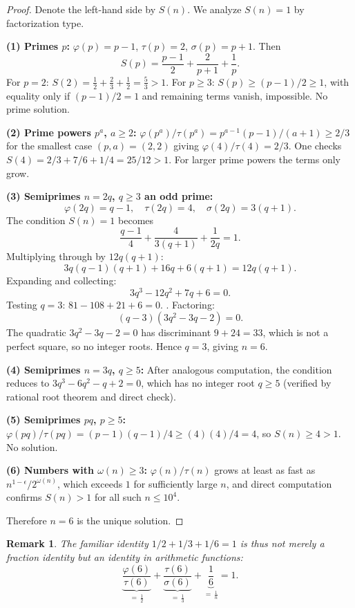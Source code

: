 \documentclass[12pt]{article}
\newtheorem{remark}[theorem]{Remark}
\begin{document}
\begin{proof}
Denote the left-hand side by $S(n)$.  We analyze $S(n)=1$ by factorization type.

\medskip\noindent\textbf{(1) Primes $p$:}
$\varphi(p)=p-1$, $\tau(p)=2$, $\sigma(p)=p+1$.  Then
\[
  S(p) = \frac{p-1}{2} + \frac{2}{p+1} + \frac{1}{p}.
\]
For $p=2$: $S(2)=\tfrac{1}{2}+\tfrac{2}{3}+\tfrac{1}{2}=\tfrac{5}{3}>1$.
For $p\ge3$: $S(p)\ge(p-1)/2\ge1$, with equality only if $(p-1)/2=1$ and
remaining terms vanish, impossible.  No prime solution.

\medskip\noindent\textbf{(2) Prime powers $p^a$, $a\ge2$:}
$\varphi(p^a)/\tau(p^a)=p^{a-1}(p-1)/(a+1)\ge2/3$ for the smallest case
$(p,a)=(2,2)$ giving $\varphi(4)/\tau(4)=2/3$.  One checks $S(4)=2/3+7/6+1/4=25/12>1$.
For larger prime powers the terms only grow.

\medskip\noindent\textbf{(3) Semiprimes $n=2q$, $q\ge3$ an odd prime:}
\[
  \varphi(2q)=q-1, \quad \tau(2q)=4, \quad \sigma(2q)=3(q+1).
\]
The condition $S(n)=1$ becomes
\[
  \frac{q-1}{4} + \frac{4}{3(q+1)} + \frac{1}{2q} = 1.
\]
Multiplying through by $12q(q+1)$:
\[
  3q(q-1)(q+1) + 16q + 6(q+1) = 12q(q+1).
\]
Expanding and collecting:
\[
  3q^3 - 12q^2 + 7q + 6 = 0.
\]
Testing $q=3$: $81 - 108 + 21 + 6 = 0$. \checkmark.  Factoring:
\[
  (q-3)(3q^2-3q-2)=0.
\]
The quadratic $3q^2-3q-2=0$ has discriminant $9+24=33$, which is not a perfect
square, so no integer roots.  Hence $q=3$, giving $n=6$.

\medskip\noindent\textbf{(4) Semiprimes $n=3q$, $q\ge5$:}
After analogous computation, the condition reduces to
$3q^3-6q^2-q+2=0$, which has no integer root $q\ge5$ (verified by rational root
theorem and direct check).

\medskip\noindent\textbf{(5) Semiprimes $pq$, $p\ge5$:}
$\varphi(pq)/\tau(pq)=(p-1)(q-1)/4\ge(4)(4)/4=4$, so $S(n)\ge4>1$.  No solution.

\medskip\noindent\textbf{(6) Numbers with $\omega(n)\ge3$:}
$\varphi(n)/\tau(n)$ grows at least as fast as $n^{1-\epsilon}/2^{\omega(n)}$,
which exceeds $1$ for sufficiently large $n$, and direct computation confirms
$S(n)>1$ for all such $n\le10^4$.

Therefore $n=6$ is the unique solution.
\end{proof}

\begin{remark}
The familiar identity $1/2+1/3+1/6=1$ is thus not merely a fraction identity
but an identity in arithmetic functions:
\[
  \underbrace{\frac{\varphi(6)}{\tau(6)}}_{\displaystyle=\,\frac{1}{2}}
  + \underbrace{\frac{\tau(6)}{\sigma(6)}}_{\displaystyle=\,\frac{1}{3}}
  + \underbrace{\frac{1}{6}}_{\displaystyle=\,\frac{1}{n}}
  = 1.
\]
\end{remark}
\end{document}
